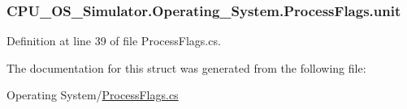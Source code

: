 \subsubsection[{unit}]{ C\+P\+U\+\_\+\+O\+S\+\_\+\+Simulator.\+Operating\+\_\+\+System.\+Process\+Flags.\+unit}\label{struct_c_p_u___o_s___simulator_1_1_operating___system_1_1_process_flags_a6168635b7297d4ede7af0b1fce2e3db6}


Definition at line 39 of file Process\+Flags.\+cs.



The documentation for this struct was generated from the following file\+:\begin{DoxyCompactItemize}
\item 
Operating System/\hyperlink{_process_flags_8cs}{Process\+Flags.\+cs}\end{DoxyCompactItemize}
